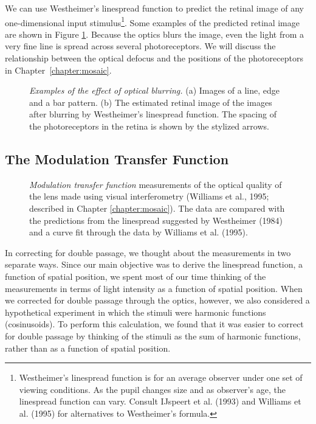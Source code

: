 We can use Westheimer's linespread function
to predict the retinal image of
any one-dimensional input stimulus\footnote{
Westheimer's linespread function is for an
average observer under one set of viewing conditions.
As the pupil changes size and as observer's age,
the linespread function can vary.
Consult IJspeert et al. (1993) and Williams et al. (1995)
for alternatives to Westheimer's formula.}.
Some examples of the predicted
retinal image are shown in Figure \ref{f1:blurring}.
Because the optics blurs the image,
even the light from a very fine line is spread across
several photoreceptors.
We will discuss the relationship between the optical defocus and
the positions of the photoreceptors in Chapter~\ref{chapter:mosaic}.
\begin{figure}
\centerline{
}
\caption[Example Retinal Images]{ 
{\em Examples of the effect of optical blurring.}
(a) Images of a line, edge and a bar pattern.
(b) The estimated retinal image
of the images after blurring by Westheimer's linespread function.
The spacing of the photoreceptors in the retina
is shown by the stylized arrows.
}
\label{f1:blurring}
\end{figure}

\subsection*{The Modulation Transfer Function}

\begin{figure}
\centerline{
}
\caption[The MTF for Westheimer's Linespread]{ 
{\em Modulation transfer function}
measurements of the optical quality of the lens
made using visual interferometry 
(Williams et al., 1995; described in Chapter \ref{chapter:mosaic}).
The data are compared with the predictions
from the linespread suggested by Westheimer (1984)
and a curve fit through the data by Williams et al. (1995).
}
\label{f1:otfTheoryData}
\end{figure}
In correcting for double passage, we thought about
the measurements in two separate ways.
Since our main objective was to derive the linespread function,
a function of spatial position,
we spent most of our time thinking of the measurements
in terms of light intensity as a function of spatial position.
When we corrected for double passage through the optics, however,
we also considered a hypothetical experiment in which
the stimuli were harmonic functions (cosinusoids).
To perform this calculation,
we found that it was easier to correct for double passage
by thinking of the stimuli as the sum of harmonic functions,
rather than as a function of spatial position.

